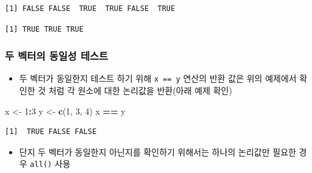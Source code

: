 \documentclass[
  11pt,
]{krantz}
\newenvironment{Shaded}{\begin{snugshade}}{\end{snugshade}}
\newcommand{\DecValTok}[1]{\textcolor[rgb]{0.06,0.06,0.06}{#1}}
\newcommand{\KeywordTok}[1]{\textcolor[rgb]{0.27,0.27,0.27}{\textbf{#1}}}
\newcommand{\NormalTok}[1]{#1}
\newcommand{\OperatorTok}[1]{\textcolor[rgb]{0.43,0.43,0.43}{\textbf{#1}}}
\newcommand{\StringTok}[1]{\textcolor[rgb]{0.5,0.5,0.5}{#1}}
\providecommand{\tightlist}{%
  \setlength{\itemsep}{0pt}\setlength{\parskip}{0pt}}
\begin{document}
\begin{verbatim}
[1] FALSE FALSE  TRUE  TRUE FALSE  TRUE
\end{verbatim}

\begin{Shaded}
\end{Shaded}

\begin{verbatim}
[1] TRUE TRUE TRUE
\end{verbatim}

\normalsize

\hypertarget{vec-identical}{%
\subsubsection*{\texorpdfstring{\textbf{두 벡터의 동일성 테스트}}{두 벡터의 동일성 테스트}}\label{vec-identical}}


\begin{itemize}
\tightlist
\item
  두 벡터가 동일한지 테스트 하기 위해 \texttt{x\ ==\ y} 연산의 반환 값은 위의 예제에서 확인한 것 처럼 각 원소에 대한 논리값을 반환(아래 예제 확인)
\end{itemize}

\footnotesize

\begin{Shaded}
\begin{Highlighting}[]
\NormalTok{x <-}\StringTok{ }\DecValTok{1}\OperatorTok{:}\DecValTok{3}
\NormalTok{y <-}\StringTok{ }\KeywordTok{c}\NormalTok{(}\DecValTok{1}\NormalTok{, }\DecValTok{3}\NormalTok{, }\DecValTok{4}\NormalTok{)}
\NormalTok{x }\OperatorTok{==}\StringTok{ }\NormalTok{y}
\end{Highlighting}
\end{Shaded}

\begin{verbatim}
[1]  TRUE FALSE FALSE
\end{verbatim}

\normalsize

\begin{itemize}
\tightlist
\item
  단지 두 벡터가 동일한지 아닌지를 확인하기 위해서는 하나의 논리값만 필요한 경우 \texttt{all()} 사용
\end{itemize}

\footnotesize
\end{document}
